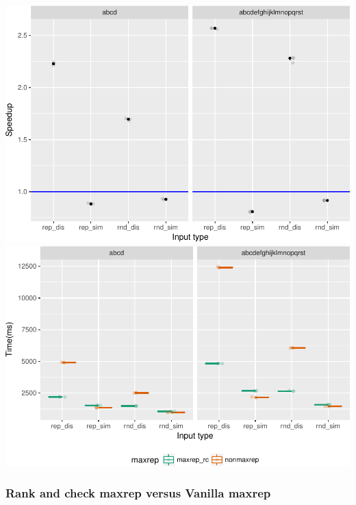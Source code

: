 \documentclass[]{article}
\begin{document}
\includegraphics{sea_2018_files/figure-latex/maxrep2_plot-1.pdf}
\includegraphics{sea_2018_files/figure-latex/maxrep2_plot-2.pdf}

\subsubsection{Rank and check maxrep versus Vanilla
maxrep}\label{rank-and-check-maxrep-versus-vanilla-maxrep}
\end{document}
